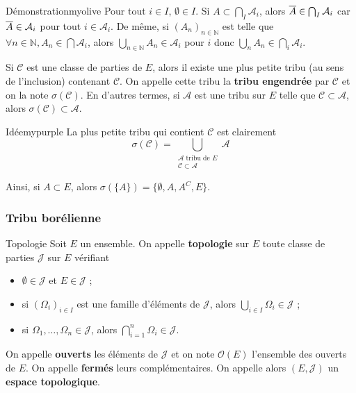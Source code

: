     \begin{demo}{Démonstration}{myolive}
        Pour tout $i \in I$, $\emptyset \in I$. Si $A \subset \bigcap_{I} \mathcal{A}_i$, alors $\overline{A} \in \bigcap_{I} \mathcal{A}_i$ car $\overline{A} \in \mathcal{A}_i$ pour tout $i \in \mathcal{A}_i$. De même, si $(A_n)_{n \in \mathbb{N}}$ est telle que $\forall n \in \mathbb{N}, A_n \in \bigcap \mathcal{A}_i$, alors $\bigcup_{n \in \mathbb{N}} A_n \in \mathcal{A}_i$ pour $i$ donc $\bigcup_n A_n \in \bigcap_i \mathcal{A}_i$.
    \end{demo}

    \begin{defitheo}{}{}
        Si $\mathcal{C}$ est une classe de parties de $E$, alors il existe une plus petite tribu (au sens de l’inclusion) contenant $\mathcal{C}$. On appelle cette tribu la \textbf{tribu engendrée} par $\mathcal{C}$ et on la note $\sigma(\mathcal{C})$. En d’autres termes, si $\mathcal{A}$ est une tribu sur $E$ telle que $\mathcal{C} \subset \mathcal{A}$, alors $\sigma(\mathcal{C}) \subset \mathcal{A}$.
    \end{defitheo}

    \begin{demo}{Idée}{mypurple}
        La plus petite tribu qui contient $\mathcal{C}$ est clairement 
        \[ \sigma(\mathcal{C}) = \bigcup_{\substack{\mathcal{A} \text{ tribu de } E \\ \mathcal{C} \subset \mathcal{A}}} \mathcal{A} \]
    \end{demo}

    Ainsi, si $A \subset E$, alors $\sigma(\{A\}) = \{ \emptyset, A, A^{C}, E \}$.

    \subsubsection{Tribu borélienne}

    \begin{defi}{Topologie}{}
        Soit $E$ un ensemble. On appelle \textbf{topologie} sur $E$ toute classe de parties $\mathcal{J}$ sur $E$ vérifiant 
        \begin{itemize}
            \item $\emptyset \in \mathcal{J}$ et $E \in \mathcal{J}$ ;
            \item si $(\Omega_i)_{i \in I}$ est une famille d’éléments de $\mathcal{J}$, alors $\bigcup_{i \in I} \Omega_i \in \mathcal{J}$ ;
            \item si $\Omega_1,\ldots,\Omega_n \in \mathcal{J}$, alors $\bigcap_{i=1}^n \Omega_i \in \mathcal{J}$.
        \end{itemize}
        On appelle \textbf{ouverts} les éléments de $\mathcal{J}$ et on note $\mathcal{O}(E)$ l’ensemble des ouverts de $E$. On appelle \textbf{fermés} leurs complémentaires. On appelle alors $(E,\mathcal{J})$ un \textbf{espace topologique}.
    \end{defi}


